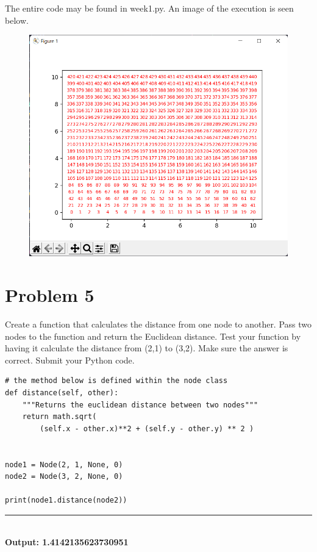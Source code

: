 \documentclass{article}
\begin{document}
\newpage
\noindent The entire code may be found in week1.py. An image of the execution is seen below.


\begin{figure}[h]
    \centering
    \includegraphics[width=\textwidth]{question4.png}
\end{figure}

\section*{Problem 5}
 
Create a function that calculates the distance from one node to another. Pass two nodes to the 
function and return the Euclidean distance. Test your function by having it calculate the distance 
from (2,1) to (3,2). Make sure the answer is correct. 
\bigskip
\noindent Submit your Python code.
\begin{mdframed}[backgroundcolor=bg]
\begin{verbatim}
# the method below is defined within the node class
def distance(self, other):
    """Returns the euclidean distance between two nodes"""
    return math.sqrt(
        (self.x - other.x)**2 + (self.y - other.y) ** 2 )


node1 = Node(2, 1, None, 0)
node2 = Node(3, 2, None, 0)

print(node1.distance(node2))
\end{verbatim}
\end{mdframed}

\noindent\rule{\textwidth}{0.4pt}\\
\textbf{Output: 1.4142135623730951}
\end{document}
